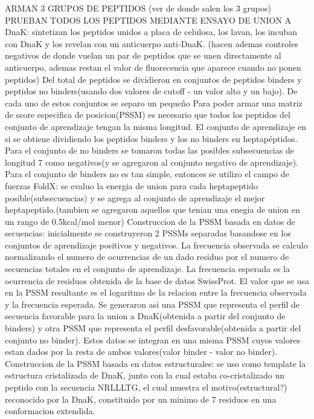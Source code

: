 ARMAN 3 GRUPOS DE PEPTIDOS (ver de donde salen los 3 grupos)
PRUEBAN TODOS LOS PEPTIDOS MEDIANTE ENSAYO DE UNION A DnaK: sintetizan los peptidos unidos a placa de celulosa, los lavan, los incuban con DnaK y los revelan con un anticuerpo anti-DnaK. (hacen ademas controles negativos de donde vuelan un par de peptidos que se unen directamente al anticuerpo, ademas restan el valor de fluorecencia que aparece cuando no ponen peptidos)
Del total de peptidos se dividieron en conjuntos de peptidos binders y peptidos no binders(usando dos valores de cutoff - un valor alto y un bajo). De cada uno de estos conjuntos se separo un pequeño %
Para poder armar una matriz de score especifica de posicion(PSSM) es necesario que todos los peptidos del conjunto de aprendizaje tengan la misma longitud. El conjunto de aprendizaje en si se obtiene dividiendo los peptidos binders y los no binders en heptapéptidos. Para el conjunto de no binders se tomaron todas las posibles subsecuencias de longitud 7 como negativos(y se agregaron al conjunto negativo de aprendizaje). Para el conjunto de binders no es tan simple, entonces se utilizo el campo de fuerzas FoldX: se evaluo la energia de union para cada heptapeptido posible(subsecuencias) y se agrega al conjunto de aprendizaje el mejor heptapeptido.(tambien se agregaron aquellos que tenian una enegia de union en un rango de 0.5kcal/mol menor)
Construccion de la PSSM basada en datos de secuencias: inicialmente se construyeron 2 PSSMs separadas basandose en los conjuntos de aprendizaje positivos y negativos. La frecuencia observada se calculo normalizando el numero de ocurrencias de un dado residuo por el numero de secuencias totales en el conjunto de aprendizaje. La frecuencia esperada es la ocurrencia de residuos obtenida de la base de datos SwissProt. El valor que se usa en la PSSM resultante es el logaritmo de la relacion entre la frecuencia observada y la frecuencia esperada. Se generaron asi una PSSM que representa el perfil de secuencia favorable para la union a DnaK(obtenida a partir del conjunto de binders) y otra PSSM que representa el perfil desfavorable(obtenida a partir del conjunto no binder). Estos datos se integran en una misma PSSM cuyos valores estan dados por la resta de ambos valores(valor binder - valor no binder).
Construccion de la PSSM basada en datos estructurales: se uso como template la estructura cristalizada de DnaK, junto con la cual estaba co-cristalizado un peptido con la secuencia NRLLLTG, el cual muestra el motivo(estructural?) reconocido por la DnaK, constituido por un minimo de 7 residuos en una conformacion extendida. 
